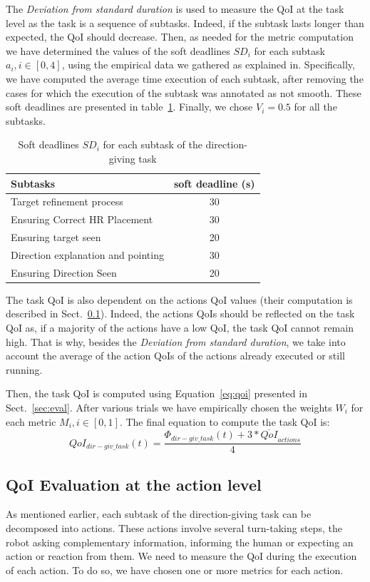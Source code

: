 \documentclass[a4paper,11pt,twoside]{StyleThese}
\begin{document}
The \emph{Deviation from standard duration} is used to measure the QoI at the task level as the task is a sequence of subtasks. Indeed, if the subtask lasts longer than expected, the QoI should decrease. Then, as needed for the metric computation we have determined the values of the soft deadlines $SD_i$ for each subtask $a_i, i \in [0,4] $, using the empirical data we gathered as explained in. Specifically, we have computed the average time execution of each subtask, after removing the cases for which the execution of the subtask was annotated as not smooth. These soft deadlines are presented in table~\ref{tab:dl}. Finally, we chose $V_i=0.5$ for all the subtasks.
\begin{table}[ht]
	\centering
	\begin{tabular}{l|c}
		\hline
		Subtasks & soft deadline (s) \\ 
		\hline
		Target refinement process &  30 \\ 
		Ensuring Correct HR Placement   & 30 \\ 
		Ensuring target seen  & 20 \\ 
		Direction explanation and pointing & 30 \\
		Ensuring Direction Seen & 20\\
		\hline
	\end{tabular}
	\caption{Soft deadlines $SD_i$ for each subtask of the direction-giving task}
	\label{tab:dl}
\end{table}

The task QoI is also dependent on the actions QoI values (their computation is described in Sect.~\ref{subsec:action_qoi}). Indeed, the actions QoIs should be reflected on the task QoI as, if a majority of the actions have a low QoI, the task QoI cannot remain high. That is why, besides the\emph{ Deviation from standard duration}, we take into account the average of the action QoIs of the actions already executed or still running.

Then, the task QoI is computed using Equation~\eqref{eq:qoi} presented in Sect.~\ref{sec:eval}. After various trials we have empirically chosen the weights $W_i$ for each metric $M_i, i \in [0,1]$. The final equation to compute the task QoI is:
\[QoI_{dir-giv\_task}(t)=\frac{ \Phi_{dir-giv\_task}(t) + 3 * \overline{QoI}_{actions} }{4}\]

\subsection{QoI Evaluation at the action level}\label{subsec:action_qoi}
As mentioned earlier, each subtask of the direction-giving task can be decomposed into actions. These actions involve several turn-taking steps, the robot asking complementary information, informing the human or expecting an action or reaction from them. We need to measure the QoI during the execution of each action. To do so, we have chosen one or more metrics for each action. 
\end{document}
